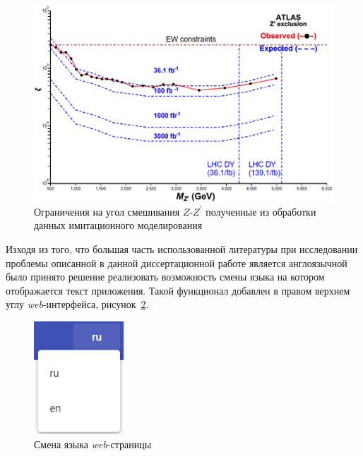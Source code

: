 \begin{figure}[!h]
	\centering
	\includegraphics[width=\textwidth]{figures/graph-result.png}
	\caption{Ограничения на угол смешивания $Z$-${Z}^{\prime}$ полученные из обработки данных имитационного моделирования}
	\label{fig:graph-result}
\end{figure}

Изходя из того, что большая часть использованной литературы при исследовании проблемы описанной в данной диссертационной работе является англоязычной было принято решение реализовать возможность смены языка на котором отображается текст приложения. Такой функционал добавлен в правом верхнем углу \textit{web}-интерфейса, рисунок~\ref{fig:language-switch}.

\vspace{18pt}
\begin{figure}[!h]
	\centering
	\includegraphics[width=0.3\textwidth]{figures/language-switch.png}
	\caption{Смена языка \textit{web}-страницы}
	\label{fig:language-switch}
\end{figure}

